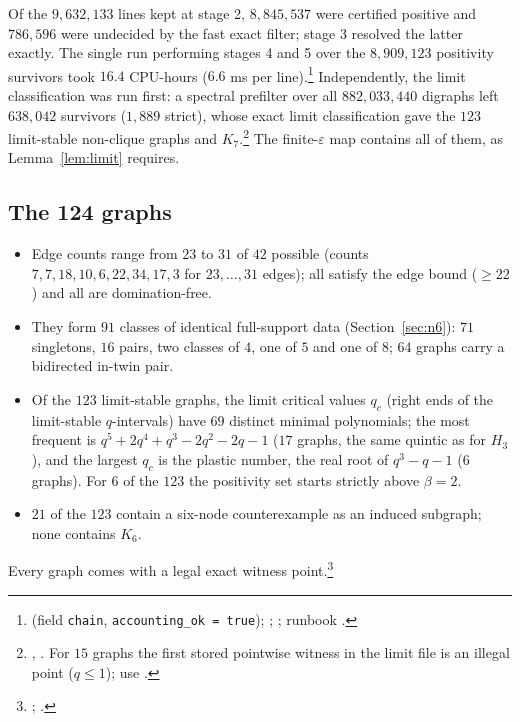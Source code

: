 \documentclass[11pt]{article}
\theoremstyle{definition}
\newcommand{\eps}{\varepsilon}
\begin{document}
Of the $9{,}632{,}133$ lines kept at stage 2, $8{,}845{,}537$ were certified positive and $786{,}596$ were undecided by the
fast exact filter; stage 3 resolved the latter exactly. The single run performing stages 4 and 5 over the $8{,}909{,}123$ positivity survivors took $16.4$ CPU-hours ($6.6$ ms per line).\footnote{ (field \texttt{chain}, \texttt{accounting\_ok = true}); ; ; runbook .}
Independently, the limit classification was run first: a spectral prefilter over all $882{,}033{,}440$ digraphs left $638{,}042$
survivors ($1{,}889$ strict), whose exact limit classification gave the $123$ limit-stable non-clique graphs and
$K_7$.\footnote{, . For $15$ graphs the first
stored pointwise witness in the limit file is an illegal point ($q\le1$); use .}
The finite-$\eps$ map contains all of them, as Lemma~\ref{lem:limit} requires.

\subsection{The 124 graphs}
\begin{itemize}
\item Edge counts range from $23$ to $31$ of $42$ possible (counts $7,7,18,10,6,22,34,17,3$ for $23,\dots,31$ edges); all
satisfy the edge bound ($\ge22$) and all are domination-free.
\item They form $91$ classes of identical full-support data (Section~\ref{sec:n6}): $71$ singletons, $16$ pairs, two classes of
$4$, one of $5$ and one of $8$; $64$ graphs carry a bidirected in-twin pair.
\item Of the $123$ limit-stable graphs, the limit critical values $q_c$ (right ends of the limit-stable $q$-intervals) have $69$ distinct minimal polynomials;
the most frequent is $q^5+2q^4+q^3-2q^2-2q-1$ ($17$ graphs, the same quintic as for $H_3$), and the largest $q_c$ is the plastic
number, the real root of $q^3-q-1$ ($6$ graphs). For $6$ of the $123$ the positivity set starts strictly above $\beta=2$.
\item $21$ of the $123$ contain a six-node counterexample as an induced subgraph; none contains $K_6$.
\end{itemize}
Every graph comes with a legal exact witness point.\footnote{; .}
\end{document}

